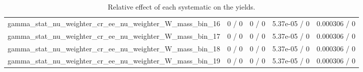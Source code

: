 \documentclass[10pt]{article}
\begin{document}
\begin{table}[htbp]
\begin{center}
\begin{tabular}{|c|c|c|c|c|}
  gamma_stat_nu_weighter_cr_ee_nu_weighter_W_mass_bin_16 & 0 / 0 & 0 / 0 & 5.37e-05 / 0 & 0.000306 / 0 \\ 
  gamma_stat_nu_weighter_cr_ee_nu_weighter_W_mass_bin_17 & 0 / 0 & 0 / 0 & 5.37e-05 / 0 & 0.000306 / 0 \\ 
  gamma_stat_nu_weighter_cr_ee_nu_weighter_W_mass_bin_18 & 0 / 0 & 0 / 0 & 5.37e-05 / 0 & 0.000306 / 0 \\ 
  gamma_stat_nu_weighter_cr_ee_nu_weighter_W_mass_bin_19 & 0 / 0 & 0 / 0 & 5.37e-05 / 0 & 0.000306 / 0 \\ 
\hline 
\end{tabular} 
\caption{Relative effect of each systematic on the yields.} 
\end{center} 
\end{table} 
\end{document}
